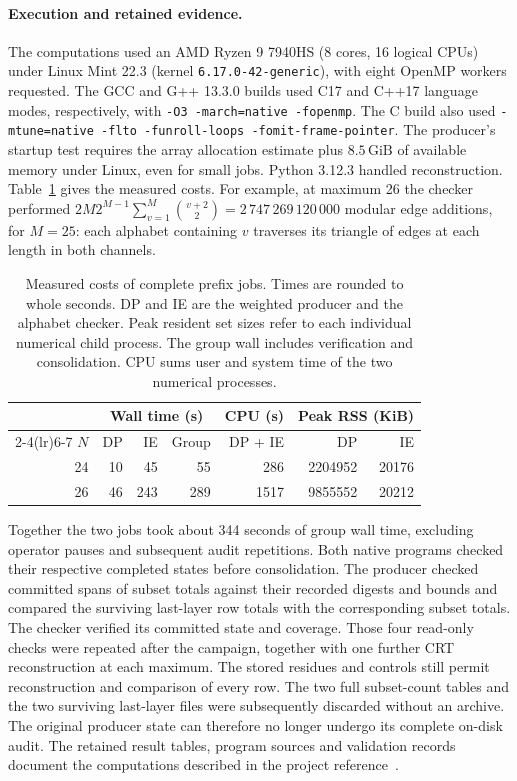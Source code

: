 \documentclass[11pt]{article}
\begin{document}
\paragraph{Execution and retained evidence.}
The computations used an AMD Ryzen 9 7940HS (8 cores, 16 logical CPUs)
under Linux Mint 22.3 (kernel \texttt{6.17.0-42-generic}), with eight
OpenMP workers requested. The GCC and
G++ 13.3.0 builds used C17 and C++17 language modes, respectively, with
\texttt{-O3 -march=native -fopenmp}. The C build also used
\texttt{-mtune=native -flto -funroll-loops -fomit-frame-pointer}.
The producer's startup test requires the array allocation estimate
plus \(8.5\,\mathrm{GiB}\) of available memory under Linux, even for small
jobs. Python 3.12.3 handled reconstruction. Table~\ref{tab:cost} gives the
measured costs. For example, at maximum 26 the checker performed
\(2M2^{M-1}\sum_{v=1}^{M}\binom{v+2}{2}
=2\,747\,269\,120\,000\) modular edge additions, for \(M=25\):
each alphabet containing \(v\) traverses its triangle of edges at
each length in both channels.

\begin{table}[htbp]\centering
\caption{Measured costs of complete prefix jobs. Times are rounded to whole
seconds. DP and IE are the weighted producer and the alphabet checker.
Peak resident set sizes refer to each individual numerical child process.
The group wall includes verification and consolidation. CPU sums user and
system time of the two numerical processes.}\label{tab:cost}
\small
\begin{tabular}{rrrrrrr}\toprule
 &\multicolumn{3}{c}{Wall time (s)}&CPU (s)&\multicolumn{2}{c}{Peak RSS (KiB)}\\
\cmidrule(lr){2-4}\cmidrule(lr){6-7}
\(N\)&DP&IE&Group&DP + IE&DP&IE\\\midrule
24&10&45&55&286&2204952&20176\\
26&46&243&289&1517&9855552&20212\\\bottomrule
\end{tabular}
\end{table}

Together the two jobs took about 344 seconds of group wall time,
excluding operator pauses and subsequent audit repetitions. Both native
programs checked their respective completed states before consolidation.
The producer checked committed spans of subset totals against their
recorded digests and bounds and compared the surviving last-layer row
totals with the corresponding subset totals. The checker verified its
committed state and coverage. Those four read-only checks were repeated
after the campaign, together
with one further CRT reconstruction at each maximum. The stored residues
and controls still permit reconstruction and comparison of every row.
The two full subset-count tables and the two surviving last-layer files
were subsequently discarded without an archive. The original producer
state can therefore no longer undergo its complete on-disk audit. The
retained result tables, program sources and validation records document
the computations described in the project reference~\cite{project}.
\end{document}
